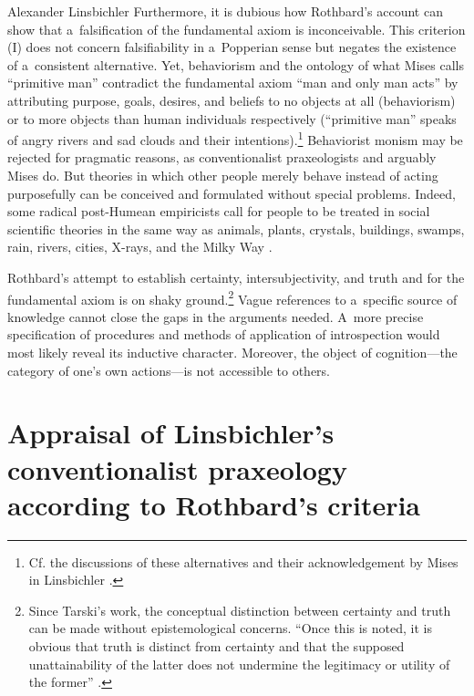 \begin{artengenv}{Alexander Linsbichler}
Furthermore, it is dubious how Rothbard's account can show that a~falsification of the fundamental axiom is inconceivable. This criterion (I) does not concern falsifiability in a~Popperian sense but negates the existence of a~consistent alternative. Yet, behaviorism and the ontology of what Mises calls ``primitive man'' contradict the fundamental axiom ``man and only man acts'' by attributing purpose, goals, desires, and beliefs to no objects at all (behaviorism) or to more objects than human individuals respectively (``primitive man'' speaks of angry rivers and sad clouds and their intentions).\footnote{Cf. the discussions of these alternatives and their acknowledgement by Mises in Linsbichler 
\parencites*[][]{linsbichler_was_2017}[][]{linsbichler_austrian_2021}.%
} Behaviorist monism may be rejected for pragmatic reasons, as conventionalist praxeologists and arguably Mises do. But theories in which other people merely behave instead of acting purposefully can be conceived and formulated without special problems. Indeed, some radical post-Humean empiricists call for people to be treated in social scientific theories in the same way as animals, plants, crystals, buildings, swamps, rain, rivers, cities, X-rays, and the Milky Way 
\parencites[see][]{neurath_foundations_1944}[][]{neurath_foundations_1970}.%




Rothbard's attempt to establish certainty, intersubjectivity, and truth and for the fundamental axiom is on shaky ground.\footnote{Since Tarski's work, the conceptual distinction between certainty and truth can be made without epistemological concerns. ``Once this is noted, it is obvious that truth is distinct from certainty and that the supposed unattainability of the latter does not undermine the legitimacy or utility of the former'' 
\parencite[][p.32]{soames_understanding_1999}.%
} Vague references to a~specific source of knowledge cannot close the gaps in the arguments needed. A~more precise specification of procedures and methods of application of introspection would most likely reveal its inductive character. Moreover, the object of cognition---the category of one's own actions---is not accessible to others.



\section{Appraisal of Linsbichler's conventionalist praxeology according to Rothbard's criteria}



\end{artengenv}

